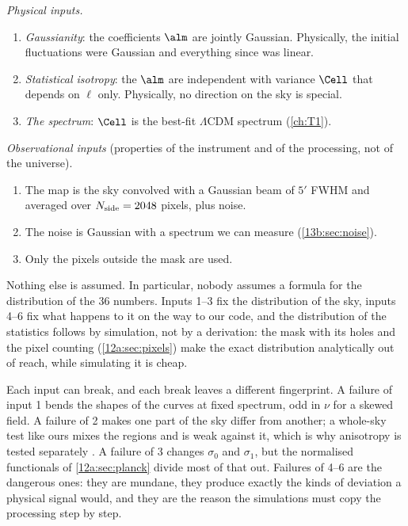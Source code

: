 \emph{Physical inputs.}
\begin{enumerate}[itemsep=2pt,leftmargin=1.5em]
  \item \emph{Gaussianity}: the coefficients $\alm$ are jointly Gaussian. Physically, the initial
        fluctuations were Gaussian and everything since was linear.
  \item \emph{Statistical isotropy}: the $\alm$ are independent with variance $\Cell$ that depends on
        $\ell$ only. Physically, no direction on the sky is special.
  \item \emph{The spectrum}: $\Cell$ is the best-fit $\Lambda$CDM spectrum (\cref{ch:T1}).
\end{enumerate}
\emph{Observational inputs} (properties of the instrument and of the processing, not of the universe).
\begin{enumerate}[itemsep=2pt,leftmargin=1.5em,resume]
  \item The map is the sky convolved with a Gaussian beam of $5'$ FWHM and averaged over $N_{\rm side}=2048$
        pixels, plus noise.
  \item The noise is Gaussian with a spectrum we can measure (\cref{13b:sec:noise}).
  \item Only the pixels outside the mask are used.
\end{enumerate}
Nothing else is assumed. In particular, nobody assumes a formula for the distribution of the $36$ numbers.
Inputs 1--3 fix the distribution of the sky, inputs 4--6 fix what happens to it on the way to our code, and
the distribution of the statistics follows by simulation, not by a derivation: the mask with its holes and
the pixel counting (\cref{12a:sec:pixels}) make the exact distribution analytically out of reach, while
simulating it is cheap.

Each input can break, and each break leaves a different fingerprint. A failure of input 1 bends the shapes of
the curves at fixed spectrum, odd in $\nu$ for a skewed field. A failure of 2 makes one part of the sky differ
from another; a whole-sky test like ours mixes the regions and is weak against it, which is why anisotropy is
tested separately \cite{Planck2018VII}. A failure of 3 changes $\sigma_0$ and $\sigma_1$, but the normalised
functionals of \cref{12a:sec:planck} divide most of that out. Failures of 4--6 are the dangerous ones: they are
mundane, they produce exactly the kinds of deviation a physical signal would, and they are the reason the
simulations must copy the processing step by step.

